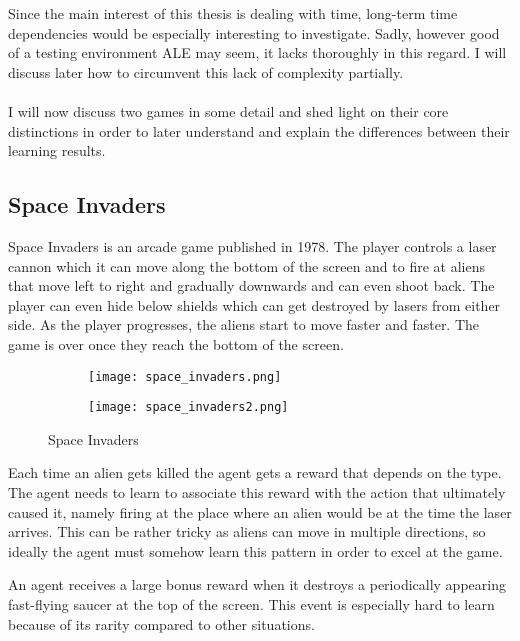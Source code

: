 Since the main interest of this thesis
is dealing with time,
long-term time dependencies would be especially interesting to investigate.
Sadly, however good of a testing environment ALE may seem,
it lacks thoroughly in this regard.
I will discuss later how to circumvent this lack of complexity partially.

\paragraph{}
I will now discuss two games in some detail
and shed light on their core distinctions
in order to later understand and explain
the differences between their learning results.

\subsection{Space Invaders}
\label{sub:space_invaders}
Space Invaders is an arcade game published in 1978.
The player controls a laser cannon
which it can move along the bottom of the screen
and to fire at aliens that move left to right and gradually downwards
and can even shoot back.
The player can even hide below shields
which can get destroyed by lasers from either side.
As the player progresses,
the aliens start to move faster and faster.
The game is over
once they reach the bottom of the screen.

\begin{figure}[htpb]
  \centering
  \begin{subfigure}[t]{.49\textwidth}
    \texttt{[image: space\_invaders.png]}
  \end{subfigure}
  \begin{subfigure}[t]{.49\textwidth}
    \texttt{[image: space\_invaders2.png]}
  \end{subfigure}
  \caption{Space Invaders}
  \label{fig:space_invaders}
\end{figure}

Each time an alien gets killed the agent gets a reward
that depends on the type.
The agent needs to learn to associate this reward
with the action that ultimately caused it,
namely firing at the place where an alien would be
at the time the laser arrives.
This can be rather tricky as aliens
can move in multiple directions,
so ideally the agent must somehow learn this pattern
in order to excel at the game.

An agent receives a large bonus reward
when it destroys a periodically appearing fast-flying saucer
at the top of the screen.
This event is especially hard to learn because
of its rarity compared to other situations.


